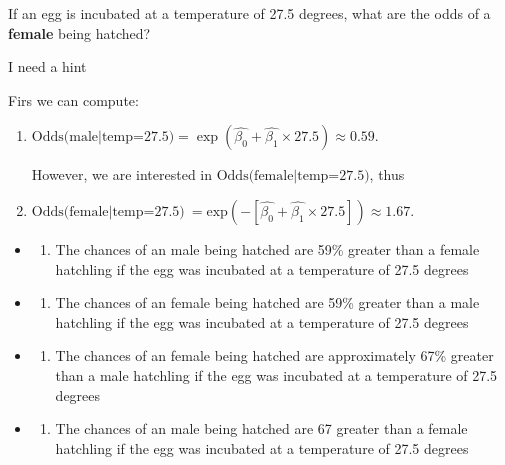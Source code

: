 \documentclass[
  letterpaper,
  DIV=11,
  numbers=noendperiod]{scrartcl}
\providecommand{\tightlist}{%
  \setlength{\itemsep}{0pt}\setlength{\parskip}{0pt}}\usepackage{longtable,booktabs,array}
\begin{document}
\begin{tcolorbox}[enhanced jigsaw, leftrule=.75mm, arc=.35mm, colback=white, opacityback=0, breakable, title={Question}, toprule=.15mm, opacitybacktitle=0.6, titlerule=0mm, rightrule=.15mm, bottomtitle=1mm, coltitle=black, toptitle=1mm, colframe=quarto-callout-tip-color-frame, bottomrule=.15mm, colbacktitle=quarto-callout-tip-color!10!white, left=2mm]

If an egg is incubated at a temperature of 27.5 degrees, what are the
odds of a \textbf{female} being hatched?

I need a hint

Firs we can compute:

\begin{enumerate}
\def\labelenumi{\arabic{enumi}.}
\item
  \(\text{Odds(male|temp=27.5)} = \exp(\hat{\beta_0} +\hat{\beta_1} \times 27.5) \approx 0.59\).

  However, we are interested in \(\text{Odds(female|temp=27.5)}\), thus
\item
  \(\text{Odds(female|temp=27.5)}~ = \mathrm{exp}\left(-\left[\hat{\beta_0} +\hat{\beta_1} \times 27.5\right]\right) \approx 1.67\).
\end{enumerate}

\begin{itemize}
\tightlist
\item
  \begin{enumerate}
  \def\labelenumi{(\Alph{enumi})}
  \tightlist
  \item
    The chances of an male being hatched are 59\% greater than a female
    hatchling if the egg was incubated at a temperature of 27.5
    degrees\\
  \end{enumerate}
\item
  \begin{enumerate}
  \def\labelenumi{(\Alph{enumi})}
  \setcounter{enumi}{1}
  \tightlist
  \item
    The chances of an female being hatched are 59\% greater than a male
    hatchling if the egg was incubated at a temperature of 27.5
    degrees\\
  \end{enumerate}
\item
  \begin{enumerate}
  \def\labelenumi{(\Alph{enumi})}
  \setcounter{enumi}{2}
  \tightlist
  \item
    The chances of an female being hatched are approximately 67\%
    greater than a male hatchling if the egg was incubated at a
    temperature of 27.5 degrees\\
  \end{enumerate}
\item
  \begin{enumerate}
  \def\labelenumi{(\Alph{enumi})}
  \setcounter{enumi}{3}
  \tightlist
  \item
    The chances of an male being hatched are 67 greater than a female
    hatchling if the egg was incubated at a temperature of 27.5 degrees
  \end{enumerate}
\end{itemize}


\end{tcolorbox}
\end{document}

